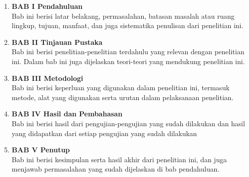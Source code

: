 \begin{enumerate}
  \item \textbf{BAB I Pendahuluan}
  \\ Bab ini berisi latar belakang, permasalahan, batasan masalah atau ruang lingkup, tujuan, manfaat, dan juga sistematika penulisan dari penelitian ini.
  \item \textbf{BAB II Tinjauan Pustaka}
  \\ Bab ini berisi penelitian-penelitian terdahulu yang relevan dengan penelitian ini. Dalam bab ini juga dijelaskan teori-teori yang mendukung penelitian ini.
  \item \textbf{BAB III Metodologi}
  \\ Bab ini berisi keperluan yang digunakan dalam penelitian ini, termasuk metode, alat yang digunakan serta urutan dalam pelaksanaan penelitian.
  \item \textbf{BAB IV Hasil dan Pembahasan}
  \\ Bab ini berisi hasil dari pengujian-pengujian yang sudah dilakukan dan hasil yang didapatkan dari setiap pengujian yang sudah dilakukan
  \item \textbf{BAB V Penutup}
  \\ Bab ini berisi kesimpulan serta hasil akhir dari penelitian ini, dan juga menjawab permasalahan yang sudah dijelaskan di bab pendahuluan.
\end{enumerate}
